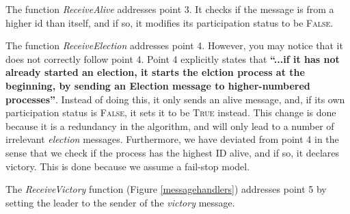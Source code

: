 \documentclass{report}
\begin{document}
The function \textit{ReceiveAlive} addresses point 3. It checks if the message is from a higher id than itself, and if so, it modifies its participation status to be \textsc{False}.

The function \textit{ReceiveElection} addresses point 4. However, you may notice that it does not correctly follow point 4. Point 4 explicitly states that \textbf{``...if it has not already started an election, it starts the elction process at the beginning, by sending an Election message to higher-numbered processes''}. Instead of doing this, it only sends an alive message, and, if its own participation status is \textsc{False}, it sets it to be \textsc{True} instead. This change is done because it is a redundancy in the algorithm, and will only lead to a number of irrelevant \textit{election} messages. Furthermore, we have deviated from point 4 in the sense that we check if the process has the highest ID alive, and if so, it declares victory. This is done because we assume a fail-stop model.

The \textit{ReceiveVictory} function (Figure \ref{messagehandlers}) addresses point 5 by setting the leader to the sender of the \textit{victory} message.
\end{document}
